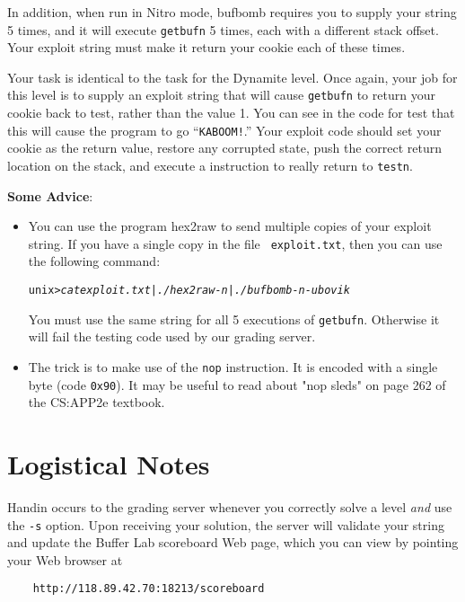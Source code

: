 \documentclass[11pt]{article}
\newenvironment{tty}%
{\small\begin{alltt}}%
{\end{alltt}}
\begin{document}
In addition, when run in Nitro mode, {\sc bufbomb} requires you to
supply your string 5 times, and it will execute {\tt getbufn} 5 times,
each with a different stack offset.  Your exploit string must make it
return your cookie each of these times.

Your task is identical to the task for the Dynamite level. Once again,
your job for this level is to supply an exploit string that will cause
\texttt{getbufn} to return your cookie back to test, rather than the value 1.
You can see in the code for test that this will cause the program to go
``{\tt KABOOM!}.'' Your exploit code should set your cookie as the return
value, restore any corrupted state, push the correct return location on
the stack, and execute a \verb@ret@ instruction to really return to
{\tt testn}.

{\bf Some Advice}:
\begin{itemize}
\item You can use the program {\sc hex2raw} to send multiple copies
of your exploit string.  If you have a single copy in the file {\tt
exploit.txt}, then you can use the following command:

\begin{tty}
    unix>{\em cat exploit.txt | ./hex2raw -n | ./bufbomb -n -u bovik}
\end{tty}

You must use the same string for all 5 executions of {\tt getbufn}.
Otherwise it will fail the testing code used by our grading server.

\item
The trick is to make use of the {\tt nop} instruction.  It is encoded
with a single byte (code {\tt 0x90}). It may be useful to read about
"nop sleds" on page 262 of the CS:APP2e textbook.

\end{itemize}


\section*{Logistical Notes}

Handin occurs to the grading server whenever you correctly solve a
level {\em and} use the \texttt{-s} option.  Upon receiving your
solution, the server will validate your string and update the Buffer
Lab scoreboard Web page, which you can view by pointing your Web
browser at
\begin{verbatim}
    http://118.89.42.70:18213/scoreboard
\end{verbatim}
\end{document}
